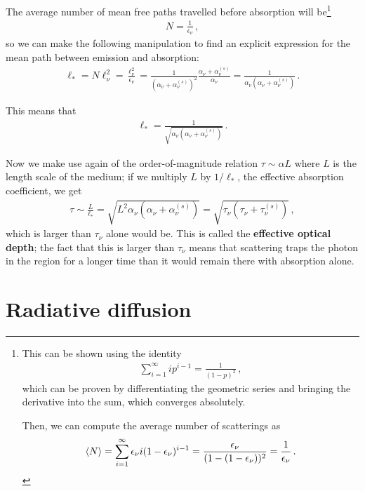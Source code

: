 \documentclass[main.tex]{subfiles}
\begin{document}
The average number of mean free paths travelled before absorption will be\footnote{This can be shown using the identity 
%
\begin{align}
\sum _{i=1}^{\infty } i p^{i-1} = \frac{1}{(1-p)^2}
\,,
\end{align}
%
which can be proven by differentiating the geometric series and bringing the derivative into the sum, which converges absolutely. 

Then, we can compute the average number of scatterings as 
%
\begin{align}
\expval{N} = \sum _{i=1}^{\infty } \epsilon_{\nu } i (1 - \epsilon_{\nu })^{i-1} = \frac{\epsilon_{\nu }}{(1 - (1 - \epsilon_{\nu }))^2} = \frac{1}{\epsilon_{\nu }}
\,.
\end{align}} 
%
\begin{align}
N = \frac{1}{\epsilon_{\nu }}
\,,
\end{align}
%
so we can make the following manipulation to find an explicit expression for the mean path between emission and absorption: 
%
\begin{align}
\ell_{*} = N \ell_{\nu }^2 = \frac{\ell_{\nu }^2}{\epsilon_{\nu }}
= \frac{1}{(\alpha_{\nu } + \alpha_{\nu }^{(s)} )^2} \frac{\alpha_{\nu }+ \alpha_{\nu }^{(s)}}{\alpha_{\nu }} 
= \frac{1}{\alpha_{\nu } (\alpha_{\nu } + \alpha_{\nu }^{(s)})}
\,.
\end{align}

This means that 
%
\begin{align}
\ell_{*} = \frac{1}{\sqrt{\alpha_{\nu } (\alpha_{\nu } + \alpha_{\nu }^{(s)})}}
\,.
\end{align}

Now we make use again of the order-of-magnitude relation \(\tau \sim \alpha L\) where \(L\) is the length scale of the medium; if we multiply \(L\) by \(1 / \ell_{*}\), the effective absorption coefficient, we get 
%
\begin{align}
\tau \sim \frac{L}{\ell_{*}} = \sqrt{L^2 \alpha_{\nu } (\alpha_{\nu } + \alpha_{\nu }^{(s)})} = \sqrt{\tau_{\nu } (\tau_{\nu } + \tau_{\nu }^{(s)})}
\,,
\end{align}
%
which is larger than \(\tau_{\nu }\) alone would be. This is called the \textbf{effective optical depth}; the fact that this is larger than \(\tau_{\nu }\) means that scattering traps the photon in the region for a longer time than it would remain there with absorption alone. 

\section{Radiative diffusion}
\end{document}
